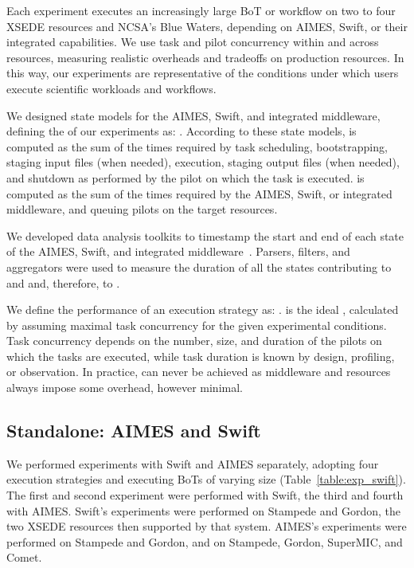 \documentclass[10pt, conference, compsocconf]{IEEEtran}
\begin{document}
Each experiment executes an increasingly large BoT or workflow on two to four
XSEDE resources and NCSA's Blue Waters, depending on AIMES, Swift, or their
integrated capabilities. We use task and pilot concurrency within and across
resources, measuring realistic overheads and tradeoffs on production
resources. In this way, our experiments are representative of the conditions
under which users execute scientific workloads and workflows.

We designed state models for the AIMES, Swift, and integrated middleware,
defining the  of our experiments as: . According to
these state models,  is computed as the sum of the times required by
task scheduling, bootstrapping, staging input files (when needed), execution,
staging output files (when needed), and shutdown as performed by the pilot on
which the task is executed.  is computed as the sum of the times
required by the AIMES, Swift, or integrated middleware, and queuing pilots on
the target resources.

We developed data analysis toolkits to timestamp the start and end of each
state of the AIMES, Swift, and integrated
middleware~\cite{aimes_swift_experiments_url}. Parsers, filters, and
aggregators were used to measure the duration of all the states contributing
to  and  and, therefore, to .

We define the performance of an execution strategy as: .  is the ideal , calculated
by assuming maximal task concurrency for the given experimental conditions.
Task concurrency depends on the number, size, and duration of the pilots on
which the tasks are executed, while task duration is known by design,
profiling, or observation. In practice,  can never be achieved as
middleware and resources always impose some overhead, however minimal.

\subsection{Standalone: AIMES and Swift}\label{ssec:exp_aimes_swift}

We performed experiments with Swift and AIMES separately, adopting four
execution strategies and executing BoTs of varying size
(Table~\ref{table:exp_swift}). The first and second experiment were performed
with Swift, the third and fourth with AIMES\@. Swift's experiments were
performed on Stampede and Gordon, the two XSEDE resources then supported by
that system. AIMES's experiments were performed on Stampede and Gordon, and
on Stampede, Gordon, SuperMIC, and Comet.
\end{document}
